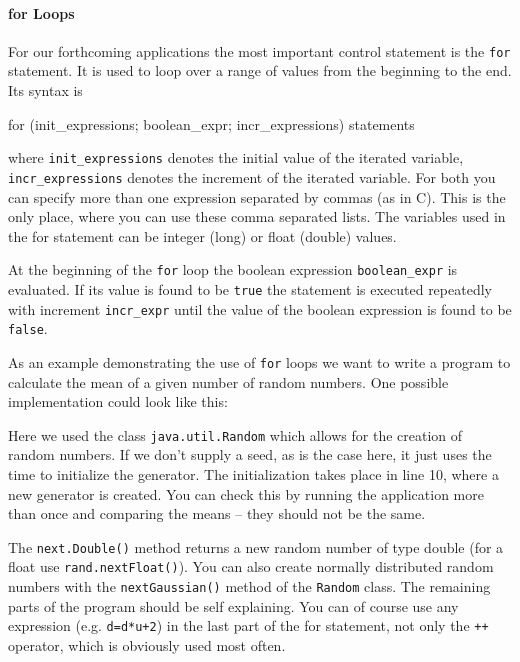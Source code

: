 \paragraph{for Loops}
For our forthcoming applications the most important control statement
is the \verb|for| statement. It is used to loop over a range of values
from the beginning to the end. Its syntax is
\begin{sverbatim}
for (init_expressions; boolean_expr; incr_expressions) {
    statements
}
\end{sverbatim}
where \verb|init_expressions| denotes the initial value of the iterated
variable, \verb|incr_expressions| denotes the increment of the iterated
variable. For both you can specify more than one expression separated
by commas (as in C). This is the only place, where you can use these comma
separated lists. The variables used in the for statement can be 
integer (long) or float (double) values. 

At the beginning of the \verb|for| loop the boolean expression
\verb|boolean_expr| is evaluated. If its value is found to be 
\verb|true| the statement is executed repeatedly with increment
\verb|incr_expr| until the value of the boolean expression is found to
be \verb|false|.

As an example demonstrating the use of
\verb|for| loops we want to write a program to calculate the mean of
a given number of random numbers. One possible implementation
could look like this:

Here we used the class \verb|java.util.Random| which allows for
the creation of random numbers. If we don't supply a seed, as is the
case here, it just uses the time to initialize the generator. The
initialization takes place in line 10, where a new generator is created.
You can check this by running the application more than once and comparing
the means -- they should not be the same. 

The \verb|next.Double()| method returns a new random number of type
double (for a float use \verb|rand.nextFloat()|). You can also create normally 
distributed random numbers with the \verb|nextGaussian()| method of
the \verb|Random| class.
The remaining parts of the program should be self explaining. You can of
course use any expression (e.g. \verb|d=d*u+2|) 
in the last part of the for statement, not only
the \verb|++| operator, which is obviously used most often. 

